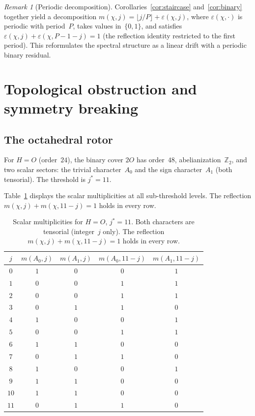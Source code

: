 \documentclass[12pt]{article}
\theoremstyle{definition}
\theoremstyle{remark}
\newtheorem{remark}[theorem]{Remark}
\newcommand{\ZZ}{\mathbb{Z}}
\begin{document}
\begin{remark}[Periodic decomposition]
  \label{rem:periodic}
  Corollaries~\ref{cor:staircase}
  and~\ref{cor:binary} together yield a
  decomposition
  $m(\chi, j) = \lfloor j/P \rfloor + \varepsilon(\chi, j)$,
  where $\varepsilon(\chi, \cdot)$ is periodic with
  period~$P$, takes values in~$\{0,1\}$, and satisfies
  $\varepsilon(\chi, j) + \varepsilon(\chi, P{-}1{-}j) = 1$
  (the reflection identity restricted to the first period).
  This reformulates the spectral structure as a linear
  drift with a periodic binary residual.
\end{remark}

\section{Topological obstruction and symmetry breaking}
\label{sec:obstruction}

\subsection{The octahedral rotor}
\label{sec:octahedral}

For $H = O$ (order~$24$), the binary cover
$2O$ has order~$48$, abelianization~$\ZZ_2$,
and two scalar sectors: the trivial character~$A_0$
and the sign character~$A_1$ (both tensorial).
The threshold is $j^* = 11$.

Table~\ref{tab:octahedral} displays the scalar
multiplicities at all sub-threshold levels.
The reflection $m(\chi, j) + m(\chi, 11{-}j) = 1$
holds in every row.

\begin{table}[ht]
\centering
\begin{tabular}{@{}ccccc@{}}
  \toprule
  $j$ & $m(A_0, j)$ & $m(A_1, j)$
    & $m(A_0, 11{-}j)$ & $m(A_1, 11{-}j)$ \\
  \midrule
  $0$  & $1$ & $0$ & $0$ & $1$ \\
  $1$  & $0$ & $0$ & $1$ & $1$ \\
  $2$  & $0$ & $0$ & $1$ & $1$ \\
  $3$  & $0$ & $1$ & $1$ & $0$ \\
  $4$  & $1$ & $0$ & $0$ & $1$ \\
  $5$  & $0$ & $0$ & $1$ & $1$ \\
  $6$  & $1$ & $1$ & $0$ & $0$ \\
  $7$  & $0$ & $1$ & $1$ & $0$ \\
  $8$  & $1$ & $0$ & $0$ & $1$ \\
  $9$  & $1$ & $1$ & $0$ & $0$ \\
  $10$ & $1$ & $1$ & $0$ & $0$ \\
  $11$ & $0$ & $1$ & $1$ & $0$ \\
  \bottomrule
\end{tabular}
\caption{Scalar multiplicities for $H = O$,
  $j^* = 11$.
  Both characters are tensorial (integer~$j$ only).
  The reflection $m(\chi, j) + m(\chi, 11{-}j) = 1$
  holds in every row.}
\label{tab:octahedral}
\end{table}
\end{document}
